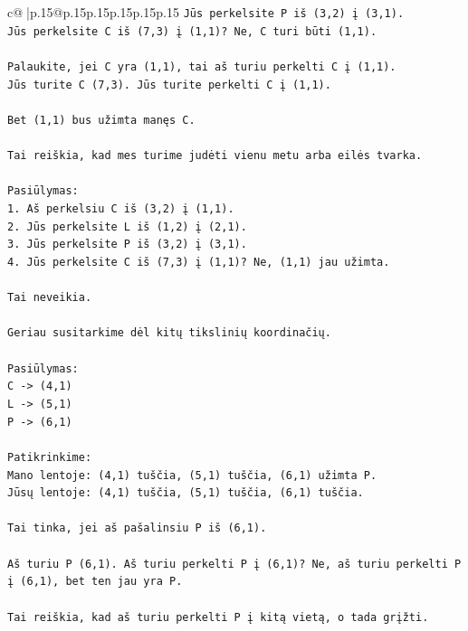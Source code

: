 \documentclass{article}
\begin{document}
{\begin{supertabular}{c@{$\;$}|p{.15\linewidth}@{}p{.15\linewidth}p{.15\linewidth}p{.15\linewidth}p{.15\linewidth}p{.15\linewidth}}
{{{\texttt{Jūs perkelsite P iš (3,2) į (3,1).} \\
\texttt{Jūs perkelsite C iš (7,3) į (1,1)? Ne, C turi būti (1,1).} \\
\\ 
\texttt{Palaukite, jei C yra (1,1), tai aš turiu perkelti C į (1,1).} \\
\texttt{Jūs turite C (7,3). Jūs turite perkelti C į (1,1).} \\
\\ 
\texttt{Bet (1,1) bus užimta manęs C.} \\
\\ 
\texttt{Tai reiškia, kad mes turime judėti vienu metu arba eilės tvarka.} \\
\\ 
\texttt{Pasiūlymas:} \\
\texttt{1. Aš perkelsiu C iš (3,2) į (1,1).} \\
\texttt{2. Jūs perkelsite L iš (1,2) į (2,1).} \\
\texttt{3. Jūs perkelsite P iš (3,2) į (3,1).} \\
\texttt{4. Jūs perkelsite C iš (7,3) į (1,1)? Ne, (1,1) jau užimta.} \\
\\ 
\texttt{Tai neveikia.} \\
\\ 
\texttt{Geriau susitarkime dėl kitų tikslinių koordinačių.} \\
\\ 
\texttt{Pasiūlymas:} \\
\texttt{C {-}> (4,1)} \\
\texttt{L {-}> (5,1)} \\
\texttt{P {-}> (6,1)} \\
\\ 
\texttt{Patikrinkime:} \\
\texttt{Mano lentoje: (4,1) tuščia, (5,1) tuščia, (6,1) užimta P.} \\
\texttt{Jūsų lentoje: (4,1) tuščia, (5,1) tuščia, (6,1) tuščia.} \\
\\ 
\texttt{Tai tinka, jei aš pašalinsiu P iš (6,1).} \\
\\ 
\texttt{Aš turiu P (6,1). Aš turiu perkelti P į (6,1)? Ne, aš turiu perkelti P į (6,1), bet ten jau yra P.} \\
\\ 
\texttt{Tai reiškia, kad aš turiu perkelti P į kitą vietą, o tada grįžti.} \\
}}}
\end{supertabular}}
\end{document}
